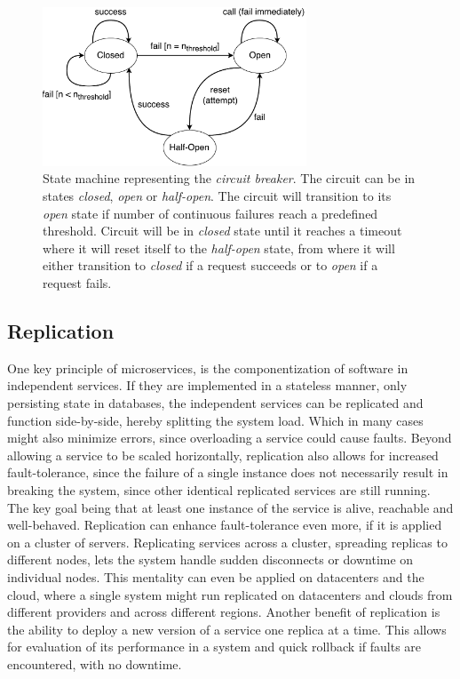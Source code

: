 \begin{figure}[H]
\centering
\includegraphics[width=0.7\textwidth]{../media/CircuitBreakerState.pdf} 
\caption{State machine representing the \textit{circuit breaker}. The
	circuit can be in states \textit{closed}, \textit{open} or \textit{half-open}.
	The circuit will transition to its \textit{open} state if number of continuous
	failures reach a predefined threshold. Circuit will be in \textit{closed}
	state until it reaches a timeout where it will reset itself to the
	\textit{half-open} state, from where it will either transition to
	\textit{closed} if a request succeeds or to \textit{open} if a request fails.}
\label{fig:circuitbreakerstate}
\end{figure}

\subsection{Replication}
One key principle of microservices, is the componentization of software in
independent services. If they are implemented in a stateless manner, only
persisting state in databases, the independent services can be replicated and
function side-by-side, hereby splitting the system load. Which in many cases
might also minimize errors, since overloading a service could cause faults.
Beyond allowing a service to be scaled horizontally, replication also allows
for increased fault-tolerance, since the failure of a single instance does not
necessarily result in breaking the system, since other identical replicated
services are still running. The key goal being that at least one instance of the
service is alive, reachable and well-behaved.
\newline\newline
Replication can enhance fault-tolerance even more, if it is applied on a cluster
of servers. Replicating services across a cluster, spreading replicas to
different nodes, lets the system handle sudden disconnects or downtime on
individual nodes. This mentality can even be applied on datacenters and the
cloud, where a single system might run replicated on datacenters and clouds
from different providers and across different regions.
\newline\newline
Another benefit of replication is the ability to deploy a new version of a
service one replica at a time. This allows for evaluation of its performance
in a system and quick rollback if faults are encountered, with no downtime.

